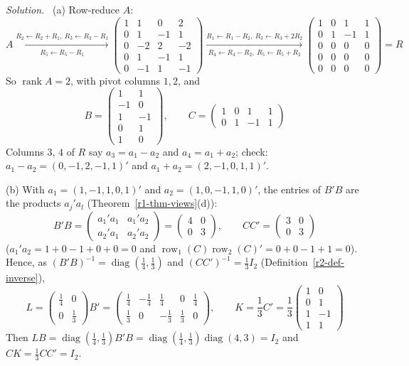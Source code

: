 \documentclass[12pt]{article}
\DeclareMathOperator{\row}{row}
\DeclareMathOperator{\diag}{diag}
\DeclareMathOperator{\rank}{rank}
\theoremstyle{definition}
\newenvironment{solution}{\par\noindent\textit{Solution.}\ }{\par\smallskip}
\begin{document}
\begin{solution}
(a) Row-reduce \(A\):
\[
A\xrightarrow[R_5\leftarrow R_5-R_1]{R_2\leftarrow R_2+R_1,\ R_3\leftarrow R_3-R_1}
\begin{pmatrix}1&1&0&2\\0&1&-1&1\\0&-2&2&-2\\0&1&-1&1\\0&-1&1&-1\end{pmatrix}
\xrightarrow[R_4\leftarrow R_4-R_2,\ R_5\leftarrow R_5+R_2]{R_1\leftarrow R_1-R_2,\ R_3\leftarrow R_3+2R_2}
\begin{pmatrix}1&0&1&1\\0&1&-1&1\\0&0&0&0\\0&0&0&0\\0&0&0&0\end{pmatrix}=R
\]
So \(\rank A=2\), with pivot columns \(1,2\), and
\[
B=\begin{pmatrix}1&1\\-1&0\\1&-1\\0&1\\1&0\end{pmatrix},\qquad
C=\begin{pmatrix}1&0&1&1\\0&1&-1&1\end{pmatrix}
\]
Columns \(3\), \(4\) of \(R\) say \(a_3=a_1-a_2\) and \(a_4=a_1+a_2\); check:
\(a_1-a_2=(0,-1,2,-1,1)'\) and \(a_1+a_2=(2,-1,0,1,1)'\).

(b) With \(a_1=(1,-1,1,0,1)'\) and \(a_2=(1,0,-1,1,0)'\), the entries of \(B'B\) are the products \(a_j'a_l\)
(Theorem~\ref{r1-thm-views}(d)):
\[
B'B=\begin{pmatrix}a_1'a_1&a_1'a_2\\a_2'a_1&a_2'a_2\end{pmatrix}=\begin{pmatrix}4&0\\0&3\end{pmatrix},\qquad
CC'=\begin{pmatrix}3&0\\0&3\end{pmatrix}
\]
(\(a_1'a_2=1+0-1+0+0=0\) and \(\row_1(C)\row_2(C)'=0+0-1+1=0\)). Hence, as \((B'B)^{-1}=\diag(\frac14,\frac13)\) and
\((CC')^{-1}=\frac13I_2\) (Definition~\ref{r2-def-inverse}),
\[
L=\begin{pmatrix}\frac14&0\\0&\frac13\end{pmatrix}B'
=\begin{pmatrix}\frac14&-\frac14&\frac14&0&\frac14\\[2pt]
\frac13&0&-\frac13&\frac13&0\end{pmatrix},\qquad
K=\frac13C'=\frac13\begin{pmatrix}1&0\\0&1\\1&-1\\1&1\end{pmatrix}
\]
Then \(LB=\diag(\frac14,\frac13)B'B=\diag(\frac14,\frac13)\diag(4,3)=I_2\) and
\(CK=\frac13CC'=I_2\).


\end{solution}
\end{document}
